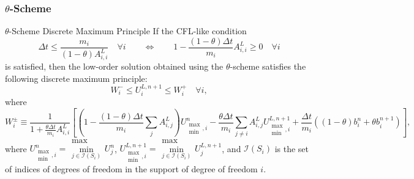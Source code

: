 \subsubsection{$\theta$-Scheme}
\begin{theorem}{$\theta$-Scheme Discrete Maximum Principle}
If the CFL-like condition
\begin{equation}\label{theta_CFL}
   \Delta t \leq \frac{m_i}{(1-\theta)A_{i,i}^L}\quad\forall i
   \qquad\Longleftrightarrow\qquad
   1 - \frac{(1-\theta)\Delta t}{m_i}A_{i,i}^L \geq 0\quad\forall i
\end{equation}
is satisfied, then the low-order solution  obtained using the $\theta$-scheme
satisfies the following discrete maximum principle:
\begin{equation}\label{theta_max_principle}
   W_i^-\leq U_i^{L,n+1}\leq W_i^+\quad\forall i,
\end{equation}
where
\begin{equation}\label{theta_W}
   W_i^\pm \equiv \frac{1}{1+\frac{\theta\Delta t}{m_i}A_{i,i}^L}
     \left[\left(1 - \frac{(1-\theta)
     \Delta t}{m_i}\sum\limits_j A_{i,j}^L\right)U_{\substack{\max\\\min},i}^n
    -\frac{\theta\Delta t}{m_i}\sum\limits_{j\ne i}A_{i,j}^L
     U_{\substack{\max\\\min},i}^{L,n+1}
    +\frac{\Delta t}{m_i}\left((1-\theta)b_i^n + \theta b_i^{n+1}\right)\right],
\end{equation}
where $U_{\substack{\max\\\min},i}^n = \substack{\max\\\min\limits_{j\in
\mathcal{I}(S_i)}}U_j^n$,
$U_{\substack{\max\\\min},i}^{L,n+1} = \substack{\max\\\min\limits_{j\in
\mathcal{I}(S_i)}}U_j^{L,n+1}$,
and $\mathcal{I}(S_i)$ is the set of indices of degrees of freedom in the
support of degree of freedom $i$.
\end{theorem}
